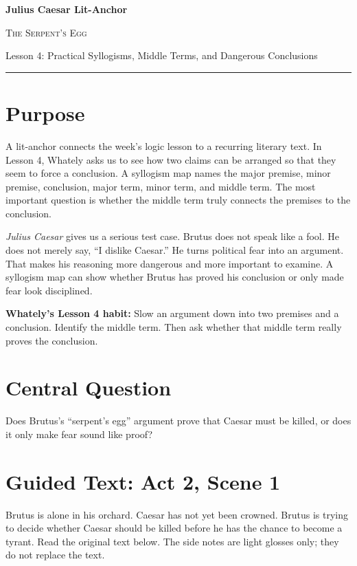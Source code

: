 \documentclass[12pt]{article}
\newcommand{\focusbox}[1]{\par\vspace{0.35em}\noindent\begingroup\setlength{\fboxsep}{6pt}\colorbox{gray!12}{\begin{minipage}{\dimexpr\linewidth-2\fboxsep\relax}#1\end{minipage}}\endgroup\par\vspace{0.45em}}
\begin{document}
\begin{center}
{\LARGE\bfseries Julius Caesar Lit-Anchor}\par\vspace{0.18em}
{\large\scshape The Serpent's Egg}\par\vspace{0.35em}
{Lesson 4: Practical Syllogisms, Middle Terms, and Dangerous Conclusions}\par\vspace{0.55em}
\rule{0.82\textwidth}{0.4pt}
\end{center}

\section*{Purpose}
A lit-anchor connects the week's logic lesson to a recurring literary text. In Lesson 4, Whately asks us to see how two claims can be arranged so that they seem to force a conclusion. A syllogism map names the major premise, minor premise, conclusion, major term, minor term, and middle term. The most important question is whether the middle term truly connects the premises to the conclusion.

\textit{Julius Caesar} gives us a serious test case. Brutus does not speak like a fool. He does not merely say, ``I dislike Caesar.'' He turns political fear into an argument. That makes his reasoning more dangerous and more important to examine. A syllogism map can show whether Brutus has proved his conclusion or only made fear look disciplined.

\focusbox{\textbf{Whately's Lesson 4 habit:} Slow an argument down into two premises and a conclusion. Identify the middle term. Then ask whether that middle term really proves the conclusion.}

\section*{Central Question}
Does Brutus's ``serpent's egg'' argument prove that Caesar must be killed, or does it only make fear sound like proof?

\section*{Guided Text: Act 2, Scene 1}
Brutus is alone in his orchard. Caesar has not yet been crowned. Brutus is trying to decide whether Caesar should be killed before he has the chance to become a tyrant. Read the original text below. The side notes are light glosses only; they do not replace the text.
\end{document}
